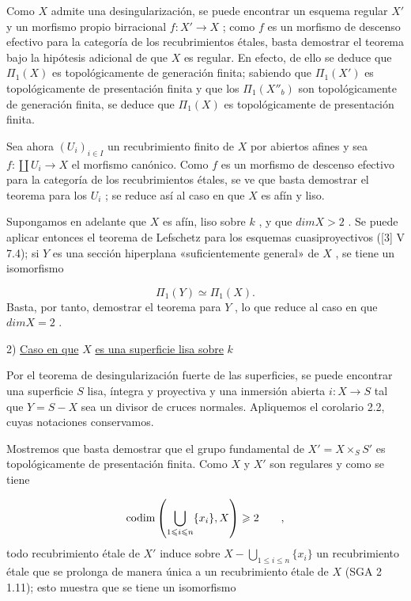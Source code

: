 Como $X$ admite una desingularización, se puede encontrar un esquema regular $X'$ y un morfismo propio birracional $f : X' \longrightarrow X$ ; como $f$ es un morfismo de descenso efectivo para la categoría de los recubrimientos étales, basta demostrar el teorema bajo la hipótesis adicional de que $X$ es regular. En efecto, de ello se deduce que $\Pi_1(X)$ es topológicamente de generación finita; sabiendo que $\Pi_1(X')$ es topológicamente de presentación finita y que los $\Pi_1(X''_b)$ son topológicamente de generación finita, se deduce que $\Pi_1(X)$ es topológicamente de presentación finita.

Sea ahora $(U_i)_{i \in I}$ un recubrimiento finito de $X$ por abiertos afines y sea $f : \coprod U_i \longrightarrow X$ el morfismo canónico. Como $f$ es un morfismo de descenso efectivo para la categoría de los recubrimientos étales, se ve que basta demostrar el teorema para los $U_i$ ; se reduce así al caso en que $X$ es afín y liso.

Supongamos en adelante que $X$ es afín, liso sobre $k$ , y que $dim X > 2$ . Se puede aplicar entonces el teorema de Lefschetz para los esquemas cuasiproyectivos ([3] V 7.4); si $Y$ es una sección hiperplana «suficientemente general» de $X$ , se tiene un isomorfismo

\begin{equation*}
\Pi_1(Y) \simeq \Pi_1(X) .
\end{equation*}
Basta, por tanto, demostrar el teorema para $Y$ , lo que reduce al caso en que $dim X = 2$ .


2) \underline{Caso en que} $X$ \underline{es una superficie lisa sobre} $k$

Por el teorema de desingularización fuerte de las superficies, se puede encontrar una superficie $S$ lisa, íntegra y proyectiva y una inmersión abierta $i : X \longrightarrow S$ tal que $Y = S - X$ sea un divisor de cruces normales. Apliquemos el corolario 2.2, cuyas notaciones conservamos.


Mostremos que basta demostrar que el grupo fundamental de $X' = X\times_S S'$ es topológicamente de presentación finita. Como $X$ y $X'$ son regulares y como se tiene

\begin{equation*}
\mathrm{codim}\sisi{(X- \bigcup_{1\leqslant i\leqslant n} \{x_i\},X)}{\left(\bigcup_{1\leqslant i\leqslant n} \{x_i\},X\right)} \geqslant 2 \qquad ,
\end{equation*}
todo recubrimiento étale de $X'$ induce sobre $X- \bigcup_{1\leqslant i\leqslant n}\{x_i\}$ un recubrimiento étale que se prolonga de manera única a un recubrimiento étale de $X$ (SGA 2 1.11); esto muestra que se tiene un isomorfismo


